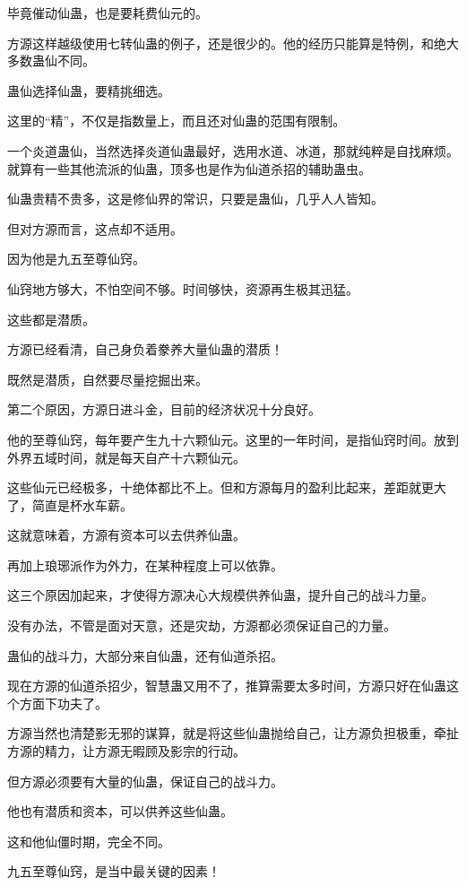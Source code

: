 \begin{this_body}
毕竟催动仙蛊，也是要耗费仙元的。

方源这样越级使用七转仙蛊的例子，还是很少的。他的经历只能算是特例，和绝大多数蛊仙不同。

蛊仙选择仙蛊，要精挑细选。

这里的“精”，不仅是指数量上，而且还对仙蛊的范围有限制。

一个炎道蛊仙，当然选择炎道仙蛊最好，选用水道、冰道，那就纯粹是自找麻烦。就算有一些其他流派的仙蛊，顶多也是作为仙道杀招的辅助蛊虫。

仙蛊贵精不贵多，这是修仙界的常识，只要是蛊仙，几乎人人皆知。

但对方源而言，这点却不适用。

因为他是九五至尊仙窍。

仙窍地方够大，不怕空间不够。时间够快，资源再生极其迅猛。

这些都是潜质。

方源已经看清，自己身负着豢养大量仙蛊的潜质！

既然是潜质，自然要尽量挖掘出来。

第二个原因，方源日进斗金，目前的经济状况十分良好。

他的至尊仙窍，每年要产生九十六颗仙元。这里的一年时间，是指仙窍时间。放到外界五域时间，就是每天自产十六颗仙元。

这些仙元已经极多，十绝体都比不上。但和方源每月的盈利比起来，差距就更大了，简直是杯水车薪。

这就意味着，方源有资本可以去供养仙蛊。

再加上琅琊派作为外力，在某种程度上可以依靠。

这三个原因加起来，才使得方源决心大规模供养仙蛊，提升自己的战斗力量。

没有办法，不管是面对天意，还是灾劫，方源都必须保证自己的力量。

蛊仙的战斗力，大部分来自仙蛊，还有仙道杀招。

现在方源的仙道杀招少，智慧蛊又用不了，推算需要太多时间，方源只好在仙蛊这个方面下功夫了。

方源当然也清楚影无邪的谋算，就是将这些仙蛊抛给自己，让方源负担极重，牵扯方源的精力，让方源无暇顾及影宗的行动。

但方源必须要有大量的仙蛊，保证自己的战斗力。

他也有潜质和资本，可以供养这些仙蛊。

这和他仙僵时期，完全不同。

九五至尊仙窍，是当中最关键的因素！

\end{this_body}

